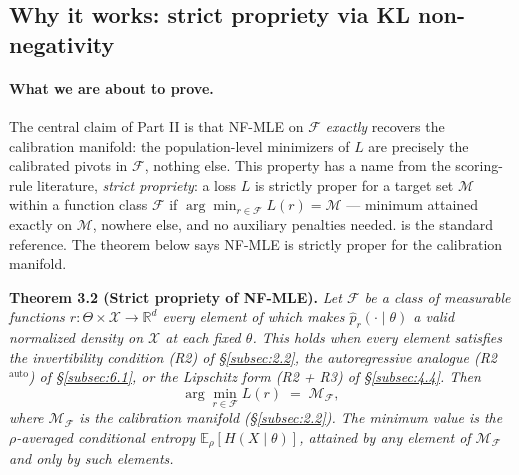 \documentclass[11pt]{article}
\begin{document}
\subsection{Why it works: strict propriety via KL non-negativity}\label{subsec:3.2}

\paragraph{What we are about to prove.}
The central claim of Part II is that NF-MLE on \(\mathcal{F}\)
\emph{exactly} recovers the calibration manifold: the population-level
minimizers of \(L\) are precisely the calibrated pivots in
\(\mathcal{F}\), nothing else. This property has a name from the
scoring-rule literature, \emph{strict propriety}: a loss \(L\) is
strictly proper for a target set \(\mathcal{M}\) within a function
class \(\mathcal{F}\) if \(\arg\min_{r \in \mathcal{F}} L(r) = \mathcal{M}\)
--- minimum attained exactly on \(\mathcal{M}\), nowhere else, and no
auxiliary penalties needed. \citet{GneitingRaftery2007} is the standard
reference. The theorem below says NF-MLE is strictly proper for the
calibration manifold.

\textbf{Theorem 3.2 (Strict propriety of NF-MLE).}\label{thm:strictprop}
\emph{Let \(\mathcal{F}\) be a class of measurable functions
\(r: \Theta \times \mathcal{X} \to \mathbb{R}^d\) every element of which
makes \(\hat p_r(\cdot \mid \theta)\) a valid normalized density on
\(\mathcal{X}\) at each fixed \(\theta\). This holds when every element
satisfies the invertibility condition (R2) of \S\ref{subsec:2.2}, the
autoregressive analogue (R2\(^{\mathrm{auto}}\)) of \S\ref{subsec:6.1},
or the Lipschitz form (R2 + R3) of \S\ref{subsec:4.4}. Then}
\[
\arg\min_{r \in \mathcal{F}} L(r) \;=\; \mathcal{M}_\mathcal{F},
\]
\emph{where \(\mathcal{M}_\mathcal{F}\) is the calibration manifold
(\S\ref{subsec:2.2}). The minimum value is the
\(\rho\)-averaged conditional entropy \(\mathbb{E}_\rho[H(X \mid \theta)]\),
attained by any element of \(\mathcal{M}_\mathcal{F}\) and only by such
elements.}
\end{document}
